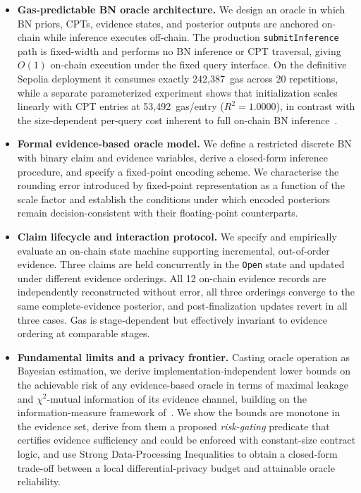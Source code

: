 \documentclass[journal]{IEEEtran}
\theoremstyle{definition}
\theoremstyle{remark}
\begin{document}
\begin{itemize}

  \item \textbf{Gas-predictable BN oracle architecture.}
  We design an oracle in which BN priors, CPTs, evidence
  states, and posterior outputs are anchored on-chain while
  inference executes off-chain. The production
  \texttt{submitInference} path is fixed-width and performs
  no BN inference or CPT traversal, giving $O(1)$ on-chain
  execution under the fixed query interface. On the
  definitive Sepolia deployment it consumes exactly
  242{,}387~gas across 20 repetitions, while a separate
  parameterized experiment shows that initialization scales
  linearly with CPT entries at 53{,}492~gas/entry
  ($R^2=1.0000$), in contrast with the size-dependent
  per-query cost inherent to full on-chain BN
  inference~\cite{naeem2025evidence}.

  \item \textbf{Formal evidence-based oracle model.}
  We define a restricted discrete BN with binary claim
  and evidence variables, derive a closed-form inference
  procedure, and specify a fixed-point encoding scheme.
  We characterise the rounding error introduced by
  fixed-point representation as a function of the scale
  factor and establish the conditions under which encoded
  posteriors remain decision-consistent with their
  floating-point counterparts.

  \item \textbf{Claim lifecycle and interaction protocol.}
  We specify and empirically evaluate an on-chain state
  machine supporting incremental, out-of-order evidence.
  Three claims are held concurrently in the
  \texttt{Open} state and updated under different evidence
  orderings. All 12 on-chain evidence records are
  independently reconstructed without error, all three
  orderings converge to the same complete-evidence
  posterior, and post-finalization updates revert in all
  three cases. Gas is stage-dependent but effectively
  invariant to evidence ordering at comparable stages.

  \item \textbf{Fundamental limits and a privacy
  frontier.}
  Casting oracle operation as Bayesian estimation, we
  derive implementation-independent lower bounds on the
  achievable risk of any evidence-based oracle in terms of
  maximal leakage and $\chi^2$-mutual information of its
  evidence channel, building on the information-measure
  framework of~\cite{esposito2024lower}. We show the
  bounds are monotone in the evidence set, derive from them
  a proposed \emph{risk-gating} predicate that certifies
  evidence sufficiency and could be enforced with
  constant-size contract logic, and use
  Strong Data-Processing Inequalities to obtain a
  closed-form trade-off between a local
  differential-privacy budget and attainable oracle
  reliability.


\end{itemize}
\end{document}
